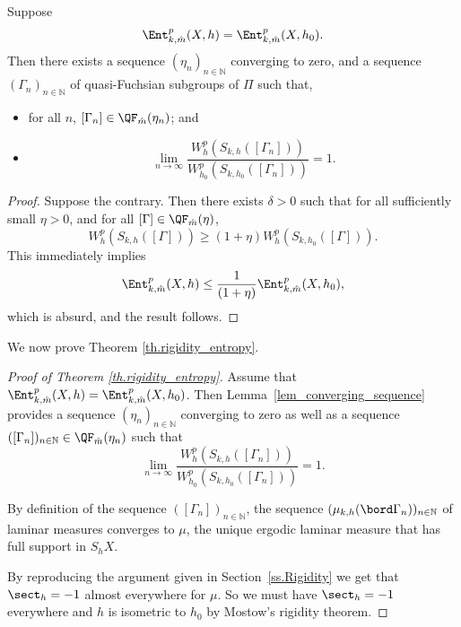 \begin{lemma}\label{lem_converging_sequence}
Suppose
\begin{equation*}
\Ent^{p}_{k,\hat m}(X,h)=\Ent^{p}_{k,\hat m}(X,h_0).
\end{equation*}
Then there exists a sequence $(\eta_n)_{n\in\mathbb{N}}$ converging to zero, and a sequence $(\Gamma_n)_{n\in\mathbb{N}}$ of quasi-Fuchsian subgroups of $\Pi$ such that,
\begin{itemize}
\item for all $n$, $[\Gamma_n]\in\QF_{\hat m}(\eta_n)$; and
\item
\begin{equation*}
\lim_{n\to\infty}\frac{W^{p}_{h}(S_{k,h}([\Gamma_n]))}{W^{p}_{h_0}(S_{k,h_0}([\Gamma_n]))}=1.
\end{equation*}
\end{itemize}
\end{lemma}

\begin{proof}
Suppose the contrary. Then there exists $\delta>0$ such that for all sufficiently small $\eta>0$, and for all $[\Gamma]\in\QF_{\hat m}(\eta)$,
\begin{equation*}
W^{p}_{h}(S_{k,h}([\Gamma]))\geq (1+\eta) W^{p}_{h}(S_{k,h_0}([\Gamma])).
\end{equation*}
This immediately implies
\begin{equation*}
\Ent^p_{k,\hat m}(X,h)\leq\frac{1}{(1+\eta)}\Ent^{p}_{k,\hat m}(X,h_0),
\end{equation*}
which is absurd, and the result follows.
\end{proof}

We now prove Theorem \ref{th.rigidity_entropy}.

\begin{proof}[Proof of Theorem \ref{th.rigidity_entropy}] Assume that $\Ent^{p}_{k,\hat m}(X,h)=\Ent^{p}_{k,\hat m}(X,h_0)$. Then Lem\-ma~\ref{lem_converging_sequence} provides a sequence $(\eta_n)_{n\in\mathbb{N}}$ converging to zero as well as a sequence $([\Gamma_n])_{n\in\mathbb{N}}\in\QF_{\hat m}(\eta_n)$ such that
\begin{equation*}
\lim_{n\to\infty}\frac{W^{p}_{h}(S_{k,h}([\Gamma_n]))}{W^{p}_{h_0}(S_{k,h_0}([\Gamma_n]))}=1.
\end{equation*}

By definition of the sequence $([\Gamma_n])_{n\in\mathbb{N}}$, the sequence $(\mu_{k,h}(\bord \Gamma_n))_{n\in\mathbb{N}}$ of laminar measures converges to $\mu$, the unique ergodic laminar measure that has full support in $S_hX$.

By reproducing the argument given in Section~\ref{ss.Rigidity} we get that $\sect_h=-1$ almost everywhere for $\mu$. So we must have $\sect_h=-1$ everywhere and $h$ is isometric to $h_0$ by Mostow's rigidity theorem.
\end{proof}

